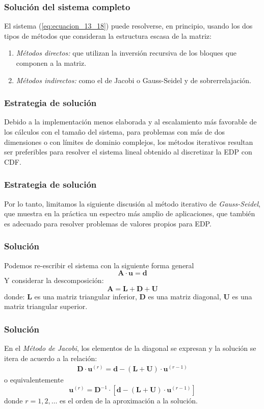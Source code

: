 \documentclass[12pt]{beamer}
\begin{document}
\begin{frame}
\frametitle{Solución del sistema completo}
El sistema (\ref{eq:ecuacion_13_18}) puede resolverse, en principio, usando los dos tipos de métodos que consideran la estructura escasa de la matriz:
\begin{enumerate}[<+->]
\item \emph{Métodos directos: } que utilizan la inversión recursiva de los bloques que componen a la matriz.
\item \emph{Métodos indirectos: } como el de Jacobi o Gauss-Seidel y de sobrerrelajación.
\end{enumerate}
\end{frame}
\begin{frame}
\frametitle{Estrategia de solución}
Debido a la implementación menos elaborada y al escalamiento más favorable de los cálculos con el tamaño del sistema, para problemas con más de dos dimensiones o con límites de dominio complejos, los métodos iterativos resultan ser preferibles para resolver el sistema lineal obtenido al discretizar la EDP con CDF.
\end{frame}
\begin{frame}
\frametitle{Estrategia de solución}
Por lo tanto, limitamos la siguiente discusión al método iterativo de \emph{Gauss-Seidel}, que muestra en la práctica un espectro más amplio de aplicaciones, que también es adecuado para resolver problemas de valores propios para EDP.
\end{frame}
\begin{frame}
\frametitle{Solución}
Podemos re-escribir el sistema con la siguiente forma general
\begin{equation}
\mathbf{A \cdot u} =  \mathbf{d}
\label{eq:ecuacion_13_19} 
\end{equation}
\pause
Y considerar la descomposición:
\begin{equation}
\mathbf{A} = \mathbf{L} + \mathbf{D} + \mathbf{U}
\label{eq:ecuacion_13_20}
\end{equation}
donde: $\mathbf{L}$ es una matriz triangular inferior, $\mathbf{D}$ es una matriz diagonal, $\mathbf{U}$ es una matriz triangular superior.
\end{frame}
\begin{frame}
\frametitle{Solución}
En el \emph{Método de Jacobi}, los elementos de la diagonal se expresan y la solución se itera de acuerdo a la relación:
\begin{align*}
\mathbf{D} \cdot \mathbf{u}^{(r)} = \mathbf{d} - (\mathbf{L} + \mathbf{U}) \cdot \mathbf{u}^{(r-1)}
\end{align*}
o equivalentemente
\begin{equation}
\mathbf{u}^{(r)} = \mathbf{D}^{-1} \cdot \left[ \mathbf{d} - (\mathbf{L} + \mathbf{U}) \cdot \mathbf{u}^{(r-1)} \right]
\label{eq:ecuacion_13_21}
\end{equation}
donde $r = 1, 2, \ldots$ es el orden de la aproximación a la solución.
\end{frame}
\end{document}
